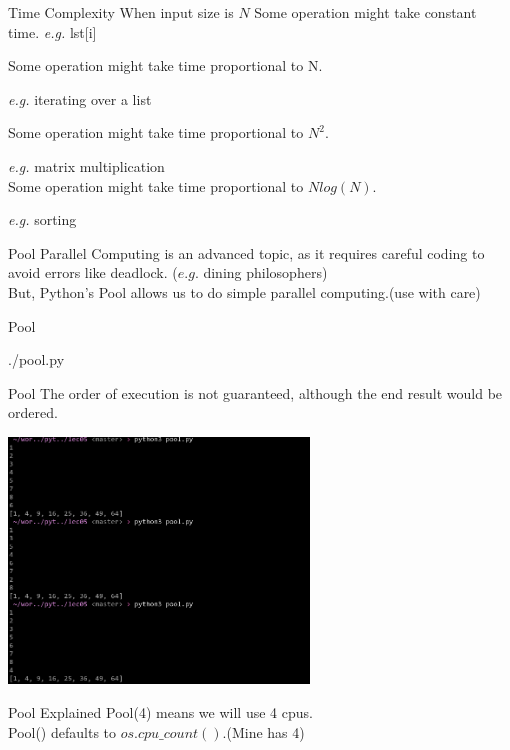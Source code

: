 \documentclass{beamer}
\begin{document}
\begin{frame}{Time Complexity}
  When input size is $N$
  Some operation might take constant time. \textit{e.g.} lst[i]

  Some operation might take time proportional to N.

  \textit{e.g.} iterating over a list

  Some operation might take time proportional to $N^{2}$.

  \textit{e.g.} matrix multiplication\\

  Some operation might take time proportional to $Nlog(N)$.

  \textit{e.g.} sorting
\end{frame}

\begin{frame}{Pool}
  Parallel Computing is an advanced topic, as it requires careful coding to
  avoid errors like deadlock. ($e.g.$ dining philosophers)\\
  But, Python's Pool allows us to do simple parallel computing.(use with care)
\end{frame}

\begin{frame}{Pool}
  \begin{lstinputlisting}
    {./pool.py}
  \end{lstinputlisting}
\end{frame}

\begin{frame}[fragile]{Pool}
  The order of execution is not guaranteed, although the end result would be
  ordered.
  \begin{center}
  \includegraphics[width=80mm]{./pool_result.png}
  \end{center}
\end{frame}

\begin{frame}{Pool Explained}
  Pool(4) means we will use 4 cpus.\\
  Pool() defaults to $os.cpu\_count()$.(Mine has 4)\\
\end{frame}
\end{document}
